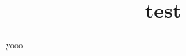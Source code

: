 \documentclass[]{article}
\title{test}
\author{}
\begin{document}
\maketitle

\begin{abstract}
yooo

\end{abstract}

\section{}
\end{document}

